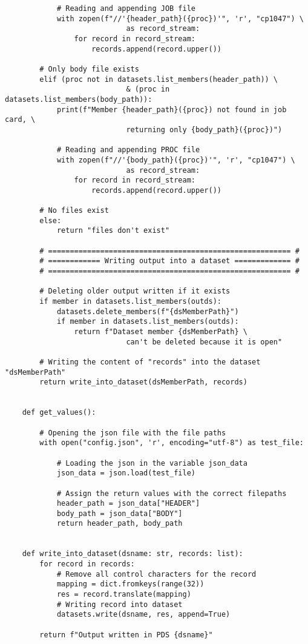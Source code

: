 \begin{lstlisting}
            # Reading and appending JOB file
            with zopen(f"//'{header_path}({proc})'", 'r', "cp1047") \
                            as record_stream:
                for record in record_stream:
                    records.append(record.upper())
        
        # Only body file exists
        elif (proc not in datasets.list_members(header_path)) \
                            & (proc in datasets.list_members(body_path)):
            print(f"Member {header_path}({proc}) not found in job card, \
                            returning only {body_path}({proc})")
            
            # Reading and appending PROC file
            with zopen(f"//'{body_path}({proc})'", 'r', "cp1047") \
                            as record_stream:
                for record in record_stream:
                    records.append(record.upper())
                    
        # No files exist 
        else:
            return "files don't exist"
        
        # ======================================================== #
        # ============ Writing output into a dataset ============= #
        # ======================================================== #
        
        # Deleting older output written if it exists
        if member in datasets.list_members(outds):
            datasets.delete_members(f"{dsMemberPath}")
            if member in datasets.list_members(outds):
                return f"Dataset member {dsMemberPath} \
                            can't be deleted because it is open"
                
        # Writing the content of "records" into the dataset "dsMemberPath"   
        return write_into_dataset(dsMemberPath, records)
    
    
    def get_values():
    
        # Opening the json file with the file paths 
        with open("config.json", 'r', encoding="utf-8") as test_file:
        
            # Loading the json in the variable json_data
            json_data = json.load(test_file)
            
            # Assign the return values with the correct filepaths
            header_path = json_data["HEADER"]
            body_path = json_data["BODY"] 
            return header_path, body_path
    
    
    def write_into_dataset(dsname: str, records: list):
        for record in records:
            # Remove all control characters for the record
            mapping = dict.fromkeys(range(32))
            res = record.translate(mapping)
            # Writing record into dataset
            datasets.write(dsname, res, append=True)
            
        return f"Output written in PDS {dsname}"
    
    
\end{lstlisting}
